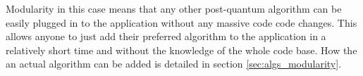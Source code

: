 Modularity in this case means that any other post-quantum algorithm can be easily plugged in to the application without any massive code code changes. This allows anyone to just add their preferred algorithm to the application in a relatively short time and without the knowledge of the whole code base. How the an actual algorithm can be added is detailed in section \ref{sec:algs_modularity}.
